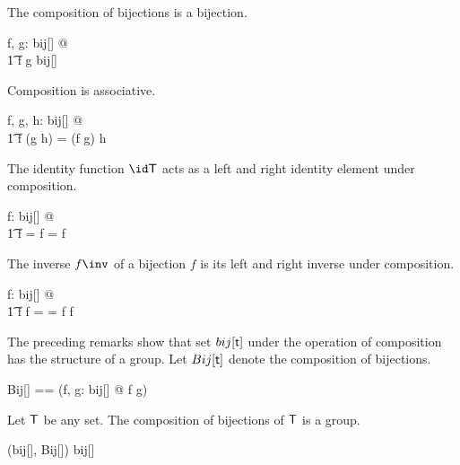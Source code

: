 \documentclass{amsart}
\begin{document}
\begin{remark}
The composition of bijections is a bijection.

\begin{zed}
	\forall f, g: bij[\setT] @ \\
	\t1	f \circ g \in bij[\setT]
\end{zed}

\end{remark}

\begin{remark}
Composition is associative.

\begin{zed}
	\forall f, g, h: bij[\setT] @ \\
	\t1	f \circ (g \circ h) = (f \circ g) \circ h
\end{zed}

\end{remark}

\begin{remark}
The identity function $\id \setT$ acts as a left and right identity element under composition.

\begin{zed}
	\forall f: bij[\setT] @ \\
	\t1	 \id \setT \circ f = f = f \circ \id \setT
\end{zed}

\end{remark}

\begin{remark}
The inverse $f \inv$ of a bijection $f$ is its left and right inverse under composition.

\begin{zed}
	\forall f: bij[\setT] @ \\
	\t1	f \circ f \inv = \id \setT = f \inv \circ f
\end{zed}

\end{remark}

The preceding remarks show that set $bij[\mathsf{t}]$ under the operation of composition has the structure of a group.
Let $Bij[\mathsf{t}]$ denote the composition of bijections.
\begin{zed}
	Bij[\genT] == (\lambda f, g: bij[\genT] @ f \circ g)
\end{zed}

\begin{example}
Let $\mathsf{T}$ be any set.
The composition of bijections of $\mathsf{T}$ is a group.

\begin{zed}
(bij[\setT], Bij[\setT]) \in \group bij[\setT]
\end{zed}

\end{example}
\end{document}

